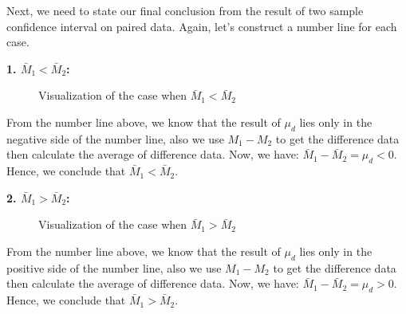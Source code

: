 Next, we need to state our final conclusion from the result of two sample confidence interval on paired data. Again, let's construct a number line for each case.

\textbf{1. $\bar{M}_1 < \bar{M}_2$:}

\begin{center}
\begin{figure}[H]
\centering
{}
\caption{Visualization of the case when $\bar{M}_1 < \bar{M}_2$}
\end{figure}
\end{center}

From the number line above, we know that the result of $\mu_d$ lies only in the negative side of the number line, also we use $M_1 - M_2$ to get the difference data then calculate the average of difference data. Now, we have: $\bar{M}_1 - \bar{M}_2 = \mu_d < 0$. Hence, we conclude that $\bar{M}_1 < \bar{M}_2.$

\textbf{2. $\bar{M}_1 > \bar{M}_2$:}

\begin{center}
\begin{figure}[H]
\centering
{}
\caption{Visualization of the case when $\bar{M}_1 > \bar{M}_2$}
\end{figure}
\end{center}

From the number line above, we know that the result of $\mu_d$ lies only in the positive side of the number line, also we use $M_1 - M_2$ to get the difference data then calculate the average of difference data. Now, we have: $\bar{M}_1 - \bar{M}_2 = \mu_d > 0$. Hence, we conclude that $\bar{M}_1 > \bar{M}_2.$


